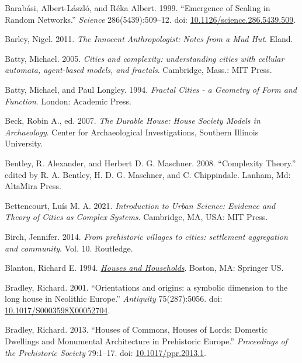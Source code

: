 \documentclass[
  12pt,
]{book}
\newlength{\cslhangindent}
\newlength{\cslentryspacingunit} %
\newenvironment{CSLReferences}[2] %
 {%
  \setlength{\parindent}{0pt}
  \ifodd #1
  \let\oldpar\par
  \def\par{\hangindent=\cslhangindent\oldpar}
  \fi
  \setlength{\parskip}{#2\cslentryspacingunit}
 }%
 {}
\begin{document}
\begin{CSLReferences}{1}{0}
\leavevmode{}%
Barabási, Albert-László, and Réka Albert. 1999. {``Emergence of Scaling in Random Networks.''} \emph{Science} 286(5439):509--12. doi: \href{https://doi.org/10.1126/science.286.5439.509}{10.1126/science.286.5439.509}.

\leavevmode{}%
Barley, Nigel. 2011. \emph{The Innocent Anthropologist: Notes from a Mud Hut}. Eland.

\leavevmode{}%
Batty, Michael. 2005. \emph{Cities and complexity: understanding cities with cellular automata, agent-based models, and fractals}. Cambridge, Mass.: MIT Press.

\leavevmode{}%
Batty, Michael, and Paul Longley. 1994. \emph{Fractal Cities - a Geometry of Form and Function}. London: Academic Press.

\leavevmode{}%
Beck, Robin A., ed. 2007. \emph{The Durable House: House Society Models in Archaeology}. Center for Archaeological Investigations, Southern Illinois University.

\leavevmode{}%
Bentley, R. Alexander, and Herbert D. G. Maschner. 2008. {``Complexity Theory.''} edited by R. A. Bentley, H. D. G. Maschner, and C. Chippindale. Lanham, Md: AltaMira Press.

\leavevmode{}%
Bettencourt, Luís M. A. 2021. \emph{Introduction to Urban Science: Evidence and Theory of Cities as Complex Systems}. Cambridge, MA, USA: MIT Press.

\leavevmode{}%
Birch, Jennifer. 2014. \emph{From prehistoric villages to cities: settlement aggregation and community}. Vol. 10. Routledge.

\leavevmode{}%
Blanton, Richard E. 1994. \emph{\href{https://doi.org/10.1007/978-1-4899-0990-9}{Houses and Households}}. Boston, MA: Springer US.

\leavevmode{}%
Bradley, Richard. 2001. {``Orientations and origins: a symbolic dimension to the long house in Neolithic Europe.''} \emph{Antiquity} 75(287):5056. doi: \href{https://doi.org/10.1017/S0003598X00052704}{10.1017/S0003598X00052704}.

\leavevmode{}%
Bradley, Richard. 2013. {``Houses of Commons, Houses of Lords: Domestic Dwellings and Monumental Architecture in Prehistoric Europe.''} \emph{Proceedings of the Prehistoric Society} 79:1--17. doi: \href{https://doi.org/10.1017/ppr.2013.1}{10.1017/ppr.2013.1}.


\end{CSLReferences}
\end{document}
